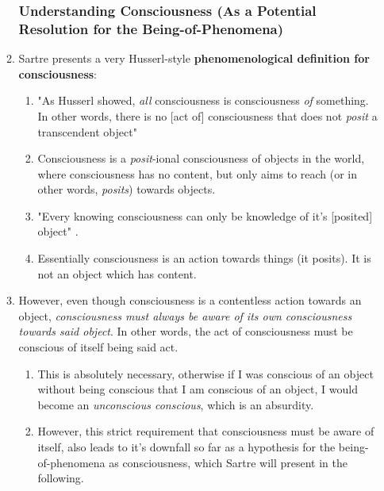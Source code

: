 \begin{enumerate}
\begin{enumerate}
    \subsubsection{Understanding Consciousness (As a Potential Resolution for the Being-of-Phenomena)}
    \item Sartre presents a very Husserl-style \textbf{phenomenological definition for consciousness}:
    \begin{enumerate}
      \item "As Husserl showed, \emph{all} consciousness is consciousness \emph{of} something. In other words, there is no [act of] consciousness that does not \emph{posit} a transcendent object" \autocite[9]{sartre}
      \item Consciousness is a \emph{posit}-ional consciousness of objects in the world, where consciousness has no content, but only aims to reach (or in other words, \emph{posits}) towards objects.
      \item "Every knowing consciousness can only be knowledge of it's [posited] object" \autocite[9]{sartre}.
      \item Essentially consciousness is an action towards things (it posits). It is not an object which has content.
    \end{enumerate}
    \item However, even though consciousness is a contentless action towards an object, \emph{consciousness must always be aware of its own consciousness towards said object}. In other words, the act of consciousness must be conscious of itself being said act.
    \begin{enumerate}
      \item This is absolutely necessary, otherwise if I was conscious of an object without being conscious that I am conscious of an object, I would become an \emph{unconscious conscious}, which is an absurdity.
      \item However, this strict requirement that consciousness must be aware of itself, also leads to it's downfall so far as a hypothesis for the being-of-phenomena as consciousness, which Sartre will present in the following.
    \end{enumerate}
  \end{enumerate}


\end{enumerate}
